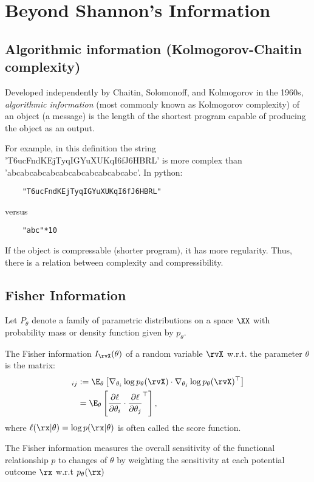 \section{Beyond Shannon's Information}
\subsection{Algorithmic information (Kolmogorov-Chaitin complexity)}
Developed independently by Chaitin, Solomonoff, and Kolmogorov in the 1960s, \emph{algorithmic information} (most commonly known as Kolmogorov complexity) of an object (\eg a message) is the length of the shortest program capable of producing the object as an output\cite{stone:2015}.

For example, in this definition the string 'T6ucFndKEjTyqIGYuXUKqI6fJ6HBRL' is more complex than  'abcabcabcabcabcabcabcabcabcabc'. In python:
\begin{lstlisting}
	"T6ucFndKEjTyqIGYuXUKqI6fJ6HBRL"
\end{lstlisting}
versus
\begin{lstlisting}
	"abc"*10
\end{lstlisting}
If the object is compressable (shorter program), it has more regularity. Thus, there is a relation between complexity and compressibility.
\subsection{Fisher Information}
Let $P_{\theta}$ denote a family of parametric distributions on a space $\XX$ with probability mass or density function given by $p_{\theta}$.

\begin{definition} The Fisher information $I_{\rvX}(\theta)$ of a random variable $\rvX$ w.r.t. the parameter $\theta$ is the matrix:
	\begin{align}
		[I_{\rvX}(\theta)]_{ij} &:= \E_{\theta} \left[ \nabla_{\theta_i} \log p_{\theta}(\rvX) \cdot  \nabla_{\theta_j} \log p_{\theta}(\rvX)^\top \right] \\
		&= \E_{\theta}\left[ \frac{\partial \ell}{\partial \theta_i} \cdot \frac{\partial \ell}{\partial \theta_j}^\top \right],
	\end{align}
	where $\ell(\rx|\theta)= \log p(\rx|\theta)$ is often called the score function.
\end{definition}
The Fisher information measures the overall sensitivity of the functional relationship $p$ to changes of $\theta$ by weighting the sensitivity at each potential outcome $\rx$ w.r.t $p_{\theta}(\rx)$\cite{maarten:2017}

